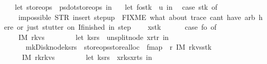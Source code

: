 \begin{isabellebody}
\ \ {\isacharparenleft}{\isacharasterisk}\ let\ store{\isacharunderscore}ops\ {\isacharequal}\ ps{}{\isacharbar}{\isachargreater}dot{\isacharunderscore}store{\isacharunderscore}ops\ in\ {\isacharasterisk}{\isacharparenright}\isanewline
\ \ let\ {\isacharparenleft}fo{\isacharcomma}stk{\isacharparenright}\ {\isacharequal}\ u\ in\isanewline
\ \ case\ stk\ of\ \isanewline
\ \ {\isacharbrackleft}{\isacharbrackright}\ {\isasymRightarrow}\ impossible{}\ {\isacharparenleft}STR\ {\isacharprime}{\isacharprime}insert{\isacharcomma}\ step{\isacharunderscore}up{\isacharprime}{\isacharprime}{\isacharparenright}\ {\isacharparenleft}{\isacharasterisk}\ FIXME\ what\ about\ trace{\isacharquery}\ can{\isacharprime}t\ have\ arb\ here{\isacharsemicolon}\ or\ just\ stutter\ on\ I{\isacharunderscore}finished\ in\ step{\isacharquery}\ {\isacharasterisk}{\isacharparenright}\isanewline
\ \ {\isacharbar}\ x{\isacharhash}stk{\isacharprime}\ {\isasymRightarrow}\ {\isacharparenleft}\isanewline
\ \ \ \ case\ fo\ of\isanewline
\ \ \ \ IM{}\ {\isacharparenleft}r{\isacharcomma}kvs{}{\isacharparenright}\ {\isasymRightarrow}\ {\isacharparenleft}\isanewline
\ \ \ \ \ \ let\ {\isacharparenleft}ks{\isacharcomma}rs{\isacharparenright}\ {\isacharequal}\ unsplit{\isacharunderscore}node\ {\isacharparenleft}x{\isasymlparr}r{\isacharunderscore}t{\isacharcolon}{\isacharequal}r{\isasymrparr}{\isacharparenright}\ in\isanewline
\ \ \ \ \ \ mk{\isacharunderscore}Disk{\isacharunderscore}node{\isacharparenleft}ks{\isacharcomma}rs{\isacharparenright}\ {\isacharbar}{\isachargreater}\ {\isacharparenleft}store{\isacharunderscore}ops{\isacharbar}{\isachargreater}store{\isacharunderscore}alloc{\isacharparenright}\ {\isacharbar}{\isachargreater}\ fmap\ {\isacharparenleft}{\isacharpercent}\ r{\isachardot}\ {\isacharparenleft}IM{}\ {\isacharparenleft}r{\isacharcomma}kvs{}{\isacharparenright}{\isacharcomma}stk{\isacharprime}{\isacharparenright}{\isacharparenright}{\isacharparenright}\isanewline
\ \ \ \ {\isacharbar}\ IM{}\ {\isacharparenleft}{\isacharparenleft}r{}{\isacharcomma}k{\isacharcomma}r{}{\isacharparenright}{\isacharcomma}kvs{}{\isacharparenright}\ {\isasymRightarrow}\ {\isacharparenleft}\isanewline
\ \ \ \ \ \ let\ {\isacharparenleft}ks{}{\isacharcomma}rs{}{\isacharparenright}\ {\isacharequal}\ {\isacharparenleft}x{\isacharbar}{\isachargreater}r{\isacharunderscore}ks{}{\isacharcomma}x{\isacharbar}{\isachargreater}r{\isacharunderscore}ts{}{\isacharparenright}\ in\isanewline

\end{isabellebody}
